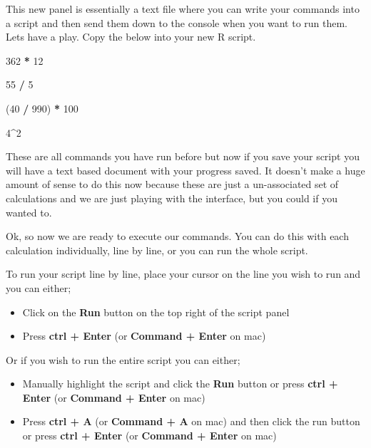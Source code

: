 \documentclass[
]{book}
\newenvironment{Shaded}{\begin{snugshade}}{\end{snugshade}}
\newcommand{\DecValTok}[1]{\textcolor[rgb]{0.00,0.00,0.81}{#1}}
\newcommand{\NormalTok}[1]{#1}
\newcommand{\SpecialCharTok}[1]{\textcolor[rgb]{0.81,0.36,0.00}{\textbf{#1}}}
\providecommand{\tightlist}{%
  \setlength{\itemsep}{0pt}\setlength{\parskip}{0pt}}
\begin{document}
This new panel is essentially a text file where you can write your commands into a script and then send them down to the console when you want to run them. Lets have a play. Copy the below into your new R script.

\begin{Shaded}
\begin{Highlighting}[]
\DecValTok{362} \SpecialCharTok{*} \DecValTok{12}

\DecValTok{55} \SpecialCharTok{/} \DecValTok{5}

\NormalTok{(}\DecValTok{40} \SpecialCharTok{/} \DecValTok{990}\NormalTok{) }\SpecialCharTok{*} \DecValTok{100}

\DecValTok{4}\SpecialCharTok{\^{}}\DecValTok{2}
\end{Highlighting}
\end{Shaded}

These are all commands you have run before but now if you save your script you will have a text based document with your progress saved. It doesn't make a huge amount of sense to do this now because these are just a un-associated set of calculations and we are just playing with the interface, but you could if you wanted to.

Ok, so now we are ready to execute our commands. You can do this with each calculation individually, line by line, or you can run the whole script.

To run your script line by line, place your cursor on the line you wish to run and you can either;

\begin{itemize}
\tightlist
\item
  Click on the \textbf{Run} button on the top right of the script panel
\item
  Press \textbf{ctrl + Enter} (or \textbf{Command + Enter} on mac)
\end{itemize}

Or if you wish to run the entire script you can either;

\begin{itemize}
\tightlist
\item
  Manually highlight the script and click the \textbf{Run} button or press \textbf{ctrl + Enter} (or \textbf{Command + Enter} on mac)
\item
  Press \textbf{ctrl + A} (or \textbf{Command + A} on mac) and then click the run button or press \textbf{ctrl + Enter} (or \textbf{Command + Enter} on mac)
\end{itemize}
\end{document}
